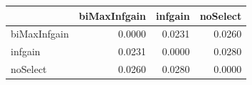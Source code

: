 \begin{tabular}{lrrr}
\toprule
 & biMaxInfgain & infgain & noSelect \\
\midrule
biMaxInfgain & 0.0000 & 0.0231 & 0.0260 \\
infgain & 0.0231 & 0.0000 & 0.0280 \\
noSelect & 0.0260 & 0.0280 & 0.0000 \\
\bottomrule
\end{tabular}
